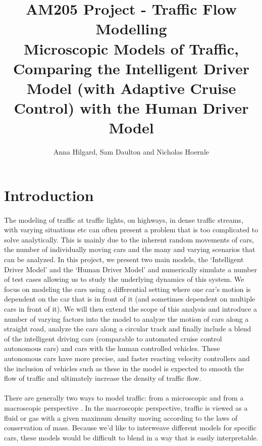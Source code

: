 \documentclass[12pt]{article}
\title{AM205 Project - Traffic Flow Modelling\\
\Large{Microscopic Models of Traffic, Comparing the Intelligent Driver Model (with Adaptive Cruise Control) with the Human Driver Model}}
\author
{Anna Hilgard, Sam Daulton and Nicholas Hoernle}
\date{}
\begin{document}

\maketitle

\section{Introduction}

\paragraph{}
The modeling of traffic at traffic lights, on highways, in dense traffic streams, with varying situations etc can often present a problem that is too complicated to solve analytically. This is mainly due to the inherent random movements of cars, the number of individually moving cars and the many and varying scenarios that can be analyzed.
In this project, we present two main models, the `Intelligent Driver Model' and the `Human Driver Model' and numerically simulate a number of test cases allowing us to study the underlying dynamics of this system. We focus on modeling the cars using a differential setting where one car's motion is dependent on the car that is in front of it (and sometimes dependent on multiple cars in front of it). We will then extend the scope of this analysis and introduce a number of varying factors into the model to analyze the motion of cars along a straight road, analyze the cars along a circular track and finally include a blend of the intelligent driving cars (comparable to automated cruise control autonomous cars) and cars with the human controlled vehicles. These autonomous cars have more precise, and faster reacting velocity controllers and the inclusion of vehicles such as these in the model is expected to smooth the flow of traffic and ultimately increase the density of traffic flow.

\paragraph{}There are generally two ways to model traffic: from a microscopic and from a macroscopic perspective \cite[Chapter~34]{microscopic_modelling}. In the macroscopic perspective, traffic is viewed as a fluid or gas with a given maximum density moving according to the laws of conservation of mass. Because we'd like to interweave different models for specific cars, these models would be difficult to blend in a way that is easily interpretable.
\end{document}

